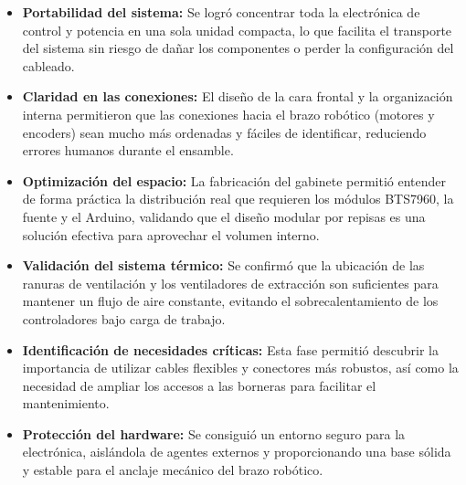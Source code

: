 \clearpage
\begin{resultadosFase}
	\begin{itemize}
		\item \textbf{Portabilidad del sistema:} Se logró concentrar toda la electrónica de control y potencia en una sola unidad compacta, lo que facilita el transporte del sistema sin riesgo de dañar los componentes o perder la configuración del cableado.
		\item \textbf{Claridad en las conexiones:} El diseño de la cara frontal y la organización interna permitieron que las conexiones hacia el brazo robótico (motores y encoders) sean mucho más ordenadas y fáciles de identificar, reduciendo errores humanos durante el ensamble.
		\item \textbf{Optimización del espacio:} La fabricación del gabinete permitió entender de forma práctica la distribución real que requieren los módulos BTS7960, la fuente y el Arduino, validando que el diseño modular por repisas es una solución efectiva para aprovechar el volumen interno.
		\item \textbf{Validación del sistema térmico:} Se confirmó que la ubicación de las ranuras de ventilación y los ventiladores de extracción son suficientes para mantener un flujo de aire constante, evitando el sobrecalentamiento de los controladores bajo carga de trabajo.
		\item \textbf{Identificación de necesidades críticas:} Esta fase permitió descubrir la importancia de utilizar cables flexibles y conectores más robustos, así como la necesidad de ampliar los accesos a las borneras para facilitar el mantenimiento.
		\item \textbf{Protección del hardware:} Se consiguió un entorno seguro para la electrónica, aislándola de agentes externos y proporcionando una base sólida y estable para el anclaje mecánico del brazo robótico.
	\end{itemize}
\end{resultadosFase}